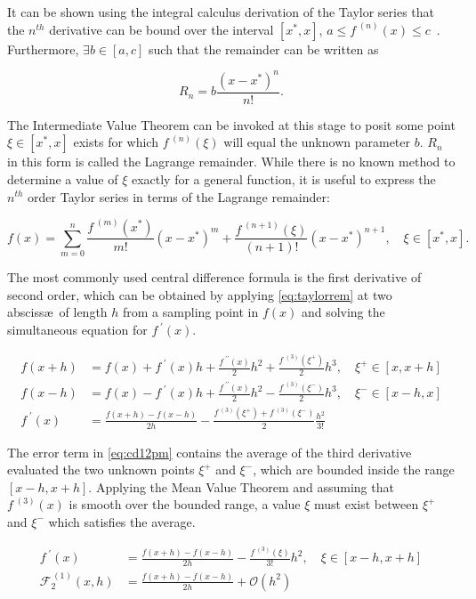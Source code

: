 It can be shown using the integral calculus derivation of the Taylor series that the $n^{th}$ derivative can be bound over the interval $[x^*, x]$, \ie $a\leq f^{\;(n)}(x) \leq c$~\cite{Greenberg1978}.
Furthermore, $\exists b \in [a,c]$ such that the remainder can be written as

\begin{equation}
   R_n = b \frac{(x-x^*)^n}{n!}.
\end{equation}

The Intermediate Value Theorem can be invoked at this stage to posit some point $\xi \in [x^*,x]$ exists for which $f^{\;(n)}(\xi)$ will equal the unknown parameter $b$.
$R_n$ in this form is called the Lagrange remainder.
While there is no known method to determine a value of $\xi$ exactly for a general function, it is useful to express the $n^{th}$ order Taylor series in terms of the Lagrange remainder:

\begin{equation}
    f(x) = \sum_{m=0}^n \frac{f^{\;(m)}(x^*)}{m!}(x-x^*)^m + \frac{f^{\;(n+1)}(\xi)}{(n+1)!}(x-x^*)^{n+1}, \quad \xi \in [x^*,x].\label{eq:taylorrem}
\end{equation}

The most commonly used central difference formula is the first derivative of second order, which can be obtained by applying \cref{eq:taylorrem} at two absciss\ae\ of length $h$ from a sampling point in $f(x)$ and solving the simultaneous equation for $f^{\;\prime}(x)$.

\begin{align}
f(x+h) &= f(x) + f^{\;\prime}(x)h + \frac{f^{\;\prime\prime}(x)}{2}h^2 + \frac{f^{\;(3)}(\xi^+)}{2}h^3, \quad \xi^+ \in [x,x+h] \\
f(x-h) &= f(x) - f^{\;\prime}(x)h + \frac{f^{\;\prime\prime}(x)}{2}h^2 - \frac{f^{\;(3)}(\xi^-)}{2}h^3, \quad \xi^- \in [x-h,x] \\
f^{\;\prime}(x) &= \frac{f(x+h)-f(x-h)}{2h} - \frac{f^{\;(3)}(\xi^+)+f^{\;(3)}(\xi^-)}{2}\frac{h^2}{3!}\label{eq:cd12pm}
\end{align}

The error term in \cref{eq:cd12pm} contains the average of the third derivative evaluated the two unknown points $\xi^+$ and $\xi^-$, which are bounded inside the range $[x-h,x+h]$.
Applying the Mean Value Theorem and assuming that $f^{\;(3)}(x)$ is smooth over the bounded range, a value $\xi$ must exist between $\xi^+$ and $\xi^-$ which satisfies the average.

\begin{align}
f^{\;\prime}(x) &= \frac{f(x+h)-f(x-h)}{2h} - \frac{f^{\;(3)}(\xi)}{3!}h^2, \quad \xi \in [x-h,x+h]\label{eq:cd12t} \\
\mathcal{F}_2^{\,(1)}(x,h) &= \frac{f(x+h)-f(x-h)}{2h} + \mathcal{O}(h^2)\label{eq:cd12f}
\end{align}


